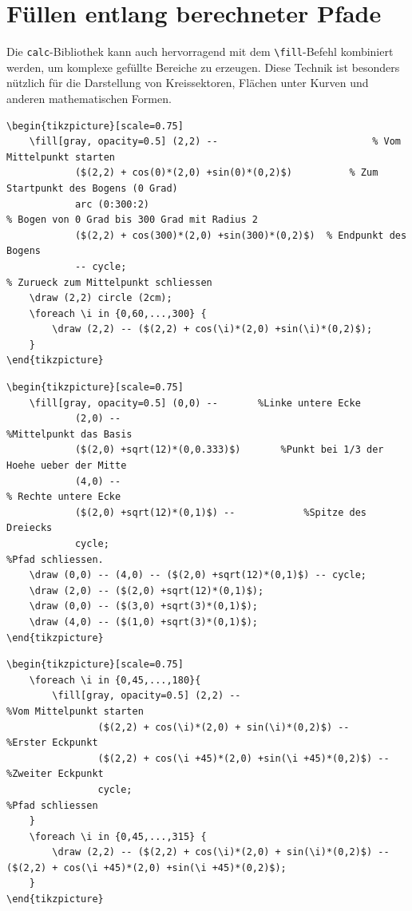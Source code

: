 \section{Füllen entlang berechneter Pfade}

Die \texttt{calc}-Bibliothek kann auch hervorragend mit dem \texttt{\textbackslash fill}-Befehl kombiniert werden, um komplexe gefüllte Bereiche zu erzeugen. Diese Technik ist besonders nützlich für die Darstellung von Kreissektoren, Flächen unter Kurven und anderen mathematischen Formen.

\begin{lstlisting}[style=latex]
% Kreissektor von 0 Grad bis 300 Grad fuellen
\begin{tikzpicture}[scale=0.75]
	\fill[gray, opacity=0.5] (2,2) -- 							% Vom Mittelpunkt starten
			($(2,2) + cos(0)*(2,0) +sin(0)*(0,2)$) 			% Zum Startpunkt des Bogens (0 Grad)
			arc (0:300:2) 															% Bogen von 0 Grad bis 300 Grad mit Radius 2
			($(2,2) + cos(300)*(2,0) +sin(300)*(0,2)$) 	% Endpunkt des Bogens
			-- cycle;																		% Zurueck zum Mittelpunkt schliessen
	\draw (2,2) circle (2cm);
	\foreach \i in {0,60,...,300} {
		\draw (2,2) -- ($(2,2) + cos(\i)*(2,0) +sin(\i)*(0,2)$);
	}
\end{tikzpicture}
\end{lstlisting}

\begin{lstlisting}[style=latex]
% Teilflaeche des Dreiecks fuellen
\begin{tikzpicture}[scale=0.75]
	\fill[gray, opacity=0.5] (0,0) --   	%Linke untere Ecke
			(2,0) -- 													%Mittelpunkt das Basis
			($(2,0) +sqrt(12)*(0,0.333)$) 		%Punkt bei 1/3 der Hoehe ueber der Mitte
			(4,0) -- 													% Rechte untere Ecke
			($(2,0) +sqrt(12)*(0,1)$) -- 			%Spitze des Dreiecks
			cycle;  													%Pfad schliessen.
	\draw (0,0) -- (4,0) -- ($(2,0) +sqrt(12)*(0,1)$) -- cycle;
	\draw (2,0) -- ($(2,0) +sqrt(12)*(0,1)$);
	\draw (0,0) -- ($(3,0) +sqrt(3)*(0,1)$);
	\draw (4,0) -- ($(1,0) +sqrt(3)*(0,1)$);
\end{tikzpicture}
\end{lstlisting}

\begin{lstlisting}[style=latex]
%Acht-Eck segmentweise fuellen
\begin{tikzpicture}[scale=0.75]
	\foreach \i in {0,45,...,180}{
		\fill[gray, opacity=0.5] (2,2) -- 												%Vom Mittelpunkt starten
				($(2,2) + cos(\i)*(2,0) + sin(\i)*(0,2)$) -- 					%Erster Eckpunkt
				($(2,2) + cos(\i +45)*(2,0) +sin(\i +45)*(0,2)$) --  	%Zweiter Eckpunkt
				cycle;   																							%Pfad schliessen
	}
	\foreach \i in {0,45,...,315} {
		\draw (2,2) -- ($(2,2) + cos(\i)*(2,0) + sin(\i)*(0,2)$) -- ($(2,2) + cos(\i +45)*(2,0) +sin(\i +45)*(0,2)$);
	}
\end{tikzpicture}
\end{lstlisting}


